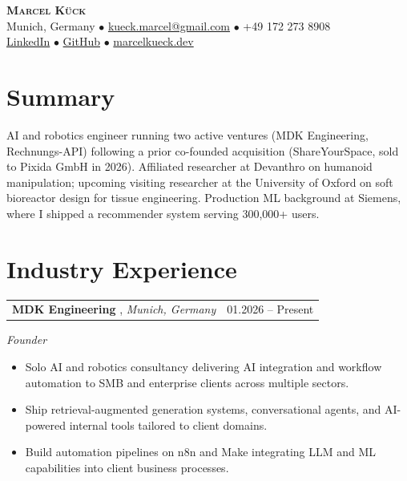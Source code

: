 \documentclass[11pt,a4paper]{article}
\makeatletter
\newcommand{\cventry}[3]{%
    \begin{tabularx}{\textwidth}{@{}Xr@{}}
        \textbf{#1}, \textit{#2} & #3 \\
    \end{tabularx}%
    \vspace{-0.35em}\par%
}
\makeatother
\begin{document}
\begin{center}
    {\Huge\scshape\bfseries Marcel Kück}\\[0.5em]
    {\small
        Munich, Germany \enspace$\bullet$\enspace
        \href{mailto:kueck.marcel@gmail.com}{kueck.marcel@gmail.com} \enspace$\bullet$\enspace
        +49 172 273 8908\\[0.15em]
        \href{https://www.linkedin.com/in/marcel-kueck}{LinkedIn} \enspace$\bullet$\enspace
        \href{https://github.com/MarcelKueck}{GitHub} \enspace$\bullet$\enspace
        \href{https://www.marcelkueck.dev/}{marcelkueck.dev}
    }
\end{center}

\section*{Summary}

AI and robotics engineer running two active ventures (MDK Engineering, Rechnungs-API) following a prior co-founded acquisition (ShareYourSpace, sold to Pixida GmbH in 2026). Affiliated researcher at Devanthro on humanoid manipulation; upcoming visiting researcher at the University of Oxford on soft bioreactor design for tissue engineering. Production ML background at Siemens, where I shipped a recommender system serving 300{,}000+ users.

\section*{Industry Experience}

\cventry{MDK Engineering \normalfont{\small(\href{https://www.marcelkueck.dev/}{marcelkueck.dev})}}{Munich, Germany}{01.2026 -- Present}
\textit{Founder}
\begin{itemize}
    \item Solo AI and robotics consultancy delivering AI integration and workflow automation to SMB and enterprise clients across multiple sectors.
    \item Ship retrieval-augmented generation systems, conversational agents, and AI-powered internal tools tailored to client domains.
    \item Build automation pipelines on n8n and Make integrating LLM and ML capabilities into client business processes.
\end{itemize}
\end{document}
